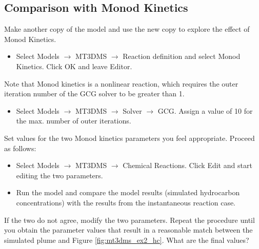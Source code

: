 \subsection{Comparison with Monod Kinetics}

Make another copy of the model and use the new copy to explore the effect 
of Monod Kinetics. 

\begin{itemize}

\item Select Models $\rightarrow$ MT3DMS $\rightarrow$ Reaction definition and
select Monod Kinetics. Click OK and leave Editor.

\end{itemize}

Note that Monod kinetics is a nonlinear reaction,
which requires the outer iteration number of the GCG solver 
to be greater than 1. 

\begin{itemize}

\item Select Models $\rightarrow$ MT3DMS $\rightarrow$ Solver $\rightarrow$ 
GCG. Assign a value of 10 for the max. number of outer iterations.

\end{itemize}

Set values for the two Monod kinetics parameters you feel appropriate. Proceed
as follows:

\begin{itemize}

\item Select Models $\rightarrow$ MT3DMS $\rightarrow$ 
Chemical Reactions. Click Edit and start editing the two
parameters.

\item  Run the model and compare the model results (simulated hydrocarbon 
concentrations) with the results from the instantaneous reaction case.

\end{itemize}

If the two do not agree, modify the two parameters. Repeat the
procedure until you obtain the parameter values that result 
in a reasonable match between the
simulated plume and Figure \ref{fig:mt3dms_ex2_hc}. What are the final values?